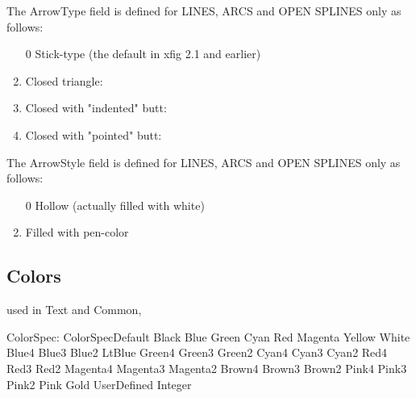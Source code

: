 \documentclass[10pt, a4paper]{article}
\begin{document}
The ArrowType field is defined for LINES, ARCS and OPEN SPLINES only as follows:
%
\begin{enumerate}
\item[0] Stick-type (the default in xfig 2.1 and earlier)
\item    Closed triangle:
 \item   Closed with "indented" butt:
\item     Closed with "pointed" butt:
\end{enumerate}


The ArrowStyle field is defined for LINES, ARCS and OPEN SPLINES only as
follows:

\begin{enumerate}
\item[0] Hollow (actually filled with white)
\item    Filled with pen-color
\end{enumerate}

\subsection{Colors}\label{subsec:paramColors}

used in Text and Common, 

ColorSpec:
ColorSpecDefault	 
Black	 
Blue	 
Green	 
Cyan	 
Red	 
Magenta	 
Yellow	 
White	 
Blue4	 
Blue3	 
Blue2	 
LtBlue	 
Green4	 
Green3	 
Green2	 
Cyan4	 
Cyan3	 
Cyan2	 
Red4	 
Red3	 
Red2	 
Magenta4	 
Magenta3	 
Magenta2	 
Brown4	 
Brown3	 
Brown2	 
Pink4	 
Pink3	 
Pink2	 
Pink	 
Gold	 
UserDefined Integer	 


{}
\end{document}

